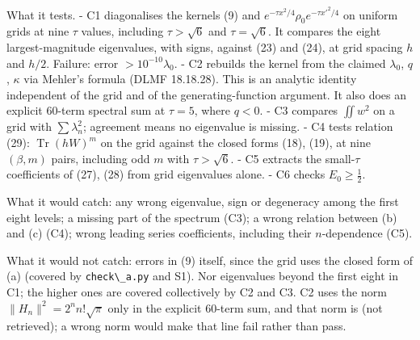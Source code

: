 \documentclass[11pt,a4paper]{article}
\newcommand{\tagmark}[1]{\marginnote{\scriptsize\ttfamily #1}}
\newcommand{\Rtag}{\tagmark{[R]}}   %
\newcommand{\passthrough}[1]{#1}
\begin{document}
What it tests. - C1 diagonalises the kernels (9) and
\(e^{-\tau x^2/4}\rho_0e^{-\tau x'^2/4}\) on uniform grids at nine
\(\tau\) values, including \(\tau>\sqrt6\) and \(\tau=\sqrt6\). It
compares the eight largest-magnitude eigenvalues, with signs, against
(23) and (24), at grid spacing \(h\) and \(h/2\). Failure: error
\(>10^{-10}\lambda_0\). - C2 rebuilds the kernel from the claimed
\(\lambda_0\), \(q\), \(\kappa\) via Mehler's formula (DLMF 18.18.28).
This is an analytic identity independent of the grid and of the
generating-function argument. It also does an explicit 60-term spectral
sum at \(\tau=5\), where \(q<0\). - C3 compares \(\iint w^2\) on a grid
with \(\sum\lambda_n^2\); agreement means no eigenvalue is missing. - C4
tests relation (29): \(\operatorname{Tr}(hW)^m\) on the grid against the
closed forms (18), (19), at nine \((\beta,m)\) pairs, including odd
\(m\) with \(\tau>\sqrt6\). - C5 extracts the small-\(\tau\)
coefficients of (27), (28) from grid eigenvalues alone. - C6 checks
\(E_0\ge\tfrac12\).

What it would catch: any wrong eigenvalue, sign or degeneracy among the
first eight levels; a missing part of the spectrum (C3); a wrong
relation between (b) and (c) (C4); wrong leading series coefficients,
including their \(n\)-dependence (C5).

What it would not catch: errors in (9) itself, since the grid uses the
closed form of (a) (covered by \passthrough{\lstinline!check\_a.py!} and
S1). Nor eigenvalues beyond the first eight in C1; the higher ones are
covered collectively by C2 and C3. C2 uses the norm
\(\|H_n\|^2 = 2^nn!\sqrt\pi\) only in the explicit 60-term sum, and that
norm is \Rtag{} (not retrieved); a wrong norm would make that line fail
rather than pass.
\end{document}
